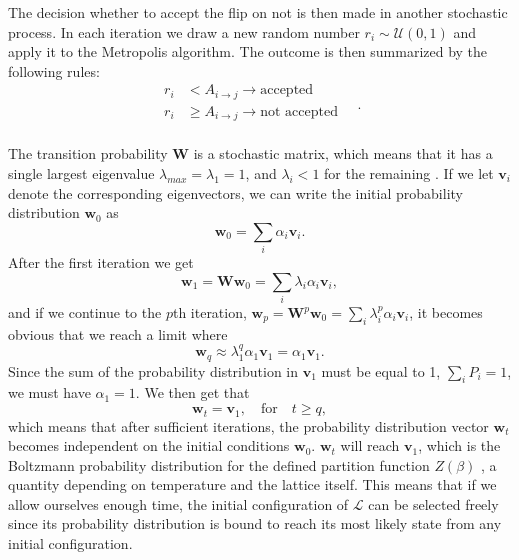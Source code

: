 \documentclass[]{article}
\begin{document}
The decision whether to accept the flip on not is then made in another stochastic process. In each iteration we draw a new random  number $r_i \sim \mathcal{U}(0,1)$ and apply it to the Metropolis algorithm. The outcome is then summarized by the following rules:
\begin{equation} \label{eq:metropolis-accept-or-not}
\begin{aligned}
	r_i &< A_{i \rightarrow j} \rightarrow \text{accepted} \\
	r_i &\ge A_{i \rightarrow j} \rightarrow \text{not accepted} \\
\end{aligned} \quad.
\end{equation}

\vspace{5mm}

The transition probability $\mathbf{W}$ is a stochastic matrix, which means that it has a single largest eigenvalue $\lambda_{max} = \lambda_1 = 1$, and $\lambda_i < 1$ for the remaining \cite{fys4150-notes}. If we let $\mathbf{v}_i$ denote the corresponding eigenvectors, we can write the initial probability distribution $\mathbf{w}_{0}$ as
\begin{equation} \label{eq:initial-state}
	\mathbf{w}_{0} = \sum_{i} \alpha_i \mathbf{v}_i.
\end{equation}
After the first iteration we get
\begin{equation}
	\mathbf{w}_{1} = \mathbf{W} \mathbf{w}_{0} = \sum_{i} \lambda_i \alpha_i \mathbf{v}_i,
\end{equation}
and if we continue to the $p$th iteration, $\mathbf{w}_{p} = \mathbf{W}^p \mathbf{w}_{0} = \sum_{i} \lambda_i^p \alpha_i \mathbf{v}_i$, it becomes obvious that we reach a limit where
\begin{equation}
	\mathbf{w}_{q} \approx \lambda_1^q \alpha_1 \mathbf{v}_1 = \alpha_1 \mathbf{v}_1.
\end{equation}
Since the sum of the probability distribution in $\mathbf{v}_1$ must be equal to 1, $\sum_{i} P_i = 1$, we must have $\alpha_1 = 1$. We then get that
\begin{equation} \label{eq:steady-state}
	\mathbf{w}_{t} = \mathbf{v}_1, \quad \text{for} \quad t \ge q,
\end{equation}
which means that after sufficient iterations, the probability distribution vector $\mathbf{w}_{t}$ becomes independent on the initial conditions $\mathbf{w}_{0}$. $\mathbf{w}_{t}$ will reach $\mathbf{v}_1$, which is the Boltzmann probability distribution for the defined partition function $Z(\beta)$ \cite{newman1999monte}, a quantity depending on temperature and the lattice itself. This means that if we allow ourselves enough time, the initial configuration of $\mathcal{L}$ can be selected freely since its probability distribution is bound to reach its most likely state from any initial configuration.
\end{document}
